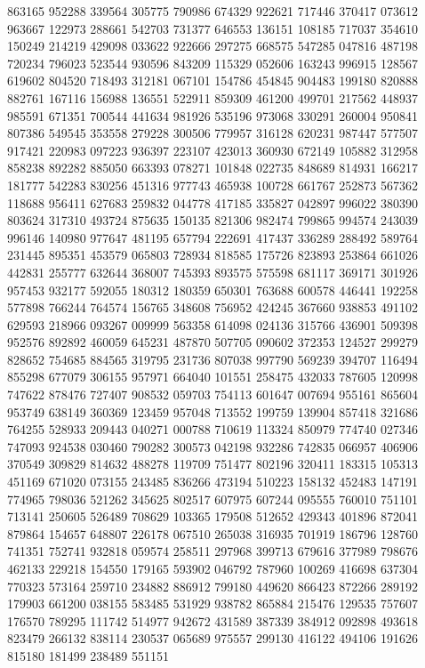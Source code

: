 {863165 952288 339564 305775 790986 674329 922621 717446 370417 073612 963667%
122973 288661 542703 731377 646553 136151 108185 717037 354610 150249 214219%
429098 033622 922666 297275 668575 547285 047816 487198 720234 796023 523544%
930596 843209 115329 052606 163243 996915 128567 619602 804520 718493 312181%
067101 154786 454845 904483 199180 820888 882761 167116 156988 136551 522911%
859309 461200 499701 217562 448937 985591 671351 700544 441634 981926 535196%
973068 330291 260004 950841 807386 549545 353558 279228 300506 779957 316128%
620231 987447 577507 917421 220983 097223 936397 223107 423013 360930 672149%
105882 312958 858238 892282 885050 663393 078271 101848 022735 848689 814931%
166217 181777 542283 830256 451316 977743 465938 100728 661767 252873 567362%
118688 956411 627683 259832 044778 417185 335827 042897 996022 380390 803624%
317310 493724 875635 150135 821306 982474 799865 994574 243039 996146 140980%
977647 481195 657794 222691 417437 336289 288492 589764 231445 895351 453579%
065803 728934 818585 175726 823893 253864 661026 442831 255777 632644 368007%
745393 893575 575598 681117 369171 301926 957453 932177 592055 180312 180359%
650301 763688 600578 446441 192258 577898 766244 764574 156765 348608 756952%
424245 367660 938853 491102 629593 218966 093267 009999 563358 614098 024136%
315766 436901 509398 952576 892892 460059 645231 487870 507705 090602 372353%
124527 299279 828652 754685 884565 319795 231736 807038 997790 569239 394707%
116494 855298 677079 306155 957971 664040 101551 258475 432033 787605 120998%
747622 878476 727407 908532 059703 754113 601647 007694 955161 865604 953749%
638149 360369 123459 957048 713552 199759 139904 857418 321686 764255 528933%
209443 040271 000788 710619 113324 850979 774740 027346 747093 924538 030460%
790282 300573 042198 932286 742835 066957 406906 370549 309829 814632 488278%
119709 751477 802196 320411 183315 105313 451169 671020 073155 243485 836266%
473194 510223 158132 452483 147191 774965 798036 521262 345625 802517 607975%
607244 095555 760010 751101 713141 250605 526489 708629 103365 179508 512652%
429343 401896 872041 879864 154657 648807 226178 067510 265038 316935 701919%
186796 128760 741351 752741 932818 059574 258511 297968 399713 679616 377989%
798676 462133 229218 154550 179165 593902 046792 787960 100269 416698 637304%
770323 573164 259710 234882 886912 799180 449620 866423 872266 289192 179903%
661200 038155 583485 531929 938782 865884 215476 129535 757607 176570 789295%
111742 514977 942672 431589 387339 384912 092898 493618 823479 266132 838114%
230537 065689 975557 299130 416122 494106 191626 815180 181499 238489 551151%
}
